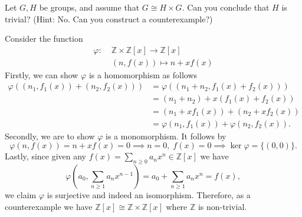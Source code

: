 \documentclass[12pt,letterpaper,boxed]{hmcpset}
\begin{document}
\begin{problem}[3.4]	
	Let $G, H$ be groups, and assume that $G\cong H\times G$. Can you conclude that $H$ is trivial? (Hint: No. Can you construct a counterexample?)
\end{problem}
\begin{solution}
	Consider the function
	\[
	\begin{aligned}
	\varphi:\;&\mathbb{Z}\times\mathbb{Z}[x]\longrightarrow\mathbb{Z}[x]\\  
	  &(n,f(x))\longmapsto n+xf(x)
	\end{aligned}
	\]
	Firstly, we can show $\varphi$ is a homomorphism as follows
	\[
	\begin{aligned}
	\varphi((n_1,f_1(x))+(n_2,f_2(x)))&=\varphi((n_1+n_2,f_1(x)+f_2(x)))\\
	&=(n_1+n_2)+x(f_1(x)+f_2(x))\\
	&=(n_1+xf_1(x))+(n_2+xf_2(x))\\
	&=\varphi(n_1,f_1(x))+\varphi(n_2,f_2(x)).
	\end{aligned}
	\]
	Secondly, we are to show $\varphi$ is a monomorphism. It follows by
	\[
	\varphi(n,f(x))=n+xf(x)=0\implies n=0,\;f(x)=0\implies \ker\varphi=\{(0,0)\}.
	\]
	Lastly, since given any $f(x)=\sum_{n\ge0}a_nx^n\in\mathbb{Z}[x]$ we have $$\varphi\left(a_0,\sum_{n\ge1}a_nx^{n-1}\right)=a_0+\sum_{n\ge1}a_nx^n=f(x),$$ 
	we claim $\varphi$ is surjective and indeed an isomorphism. Therefore, as a counterexample we have $\mathbb{Z}[x]\cong\mathbb{Z}\times\mathbb{Z}[x]$ where $\mathbb{Z}$ is non-trivial.
\end{solution}
\end{document}
